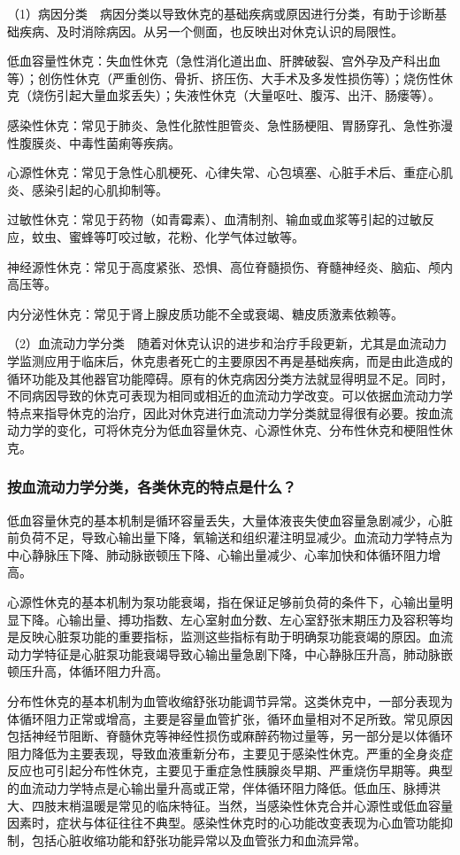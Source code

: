 （1）病因分类　病因分类以导致休克的基础疾病或原因进行分类，有助于诊断基础疾病、及时消除病因。从另一个侧面，也反映出对休克认识的局限性。

低血容量性休克：失血性休克（急性消化道出血、肝脾破裂、宫外孕及产科出血等）；创伤性休克（严重创伤、骨折、挤压伤、大手术及多发性损伤等）；烧伤性休克（烧伤引起大量血浆丢失）；失液性休克（大量呕吐、腹泻、出汗、肠瘘等）。

感染性休克：常见于肺炎、急性化脓性胆管炎、急性肠梗阻、胃肠穿孔、急性弥漫性腹膜炎、中毒性菌痢等疾病。

心源性休克：常见于急性心肌梗死、心律失常、心包填塞、心脏手术后、重症心肌炎、感染引起的心肌抑制等。

过敏性休克：常见于药物（如青霉素）、血清制剂、输血或血浆等引起的过敏反应，蚊虫、蜜蜂等叮咬过敏，花粉、化学气体过敏等。

神经源性休克：常见于高度紧张、恐惧、高位脊髓损伤、脊髓神经炎、脑疝、颅内高压等。

内分泌性休克：常见于肾上腺皮质功能不全或衰竭、糖皮质激素依赖等。

（2）血流动力学分类　随着对休克认识的进步和治疗手段更新，尤其是血流动力学监测应用于临床后，休克患者死亡的主要原因不再是基础疾病，而是由此造成的循环功能及其他器官功能障碍。原有的休克病因分类方法就显得明显不足。同时，不同病因导致的休克可表现为相同或相近的血流动力学改变。可以依据血流动力学特点来指导休克的治疗，因此对休克进行血流动力学分类就显得很有必要。按血流动力学的变化，可将休克分为低血容量休克、心源性休克、分布性休克和梗阻性休克。

\subsubsection{按血流动力学分类，各类休克的特点是什么？}

低血容量休克的基本机制是循环容量丢失，大量体液丧失使血容量急剧减少，心脏前负荷不足，导致心输出量下降，氧输送和组织灌注明显减少。血流动力学特点为中心静脉压下降、肺动脉嵌顿压下降、心输出量减少、心率加快和体循环阻力增高。

心源性休克的基本机制为泵功能衰竭，指在保证足够前负荷的条件下，心输出量明显下降。心输出量、搏功指数、左心室射血分数、左心室舒张末期压力及容积等均是反映心脏泵功能的重要指标，监测这些指标有助于明确泵功能衰竭的原因。血流动力学特征是心脏泵功能衰竭导致心输出量急剧下降，中心静脉压升高，肺动脉嵌顿压升高，体循环阻力升高。

分布性休克的基本机制为血管收缩舒张功能调节异常。这类休克中，一部分表现为体循环阻力正常或增高，主要是容量血管扩张，循环血量相对不足所致。常见原因包括神经节阻断、脊髓休克等神经性损伤或麻醉药物过量等，另一部分是以体循环阻力降低为主要表现，导致血液重新分布，主要见于感染性休克。严重的全身炎症反应也可引起分布性休克，主要见于重症急性胰腺炎早期、严重烧伤早期等。典型的血流动力学特点是心输出量升高或正常，伴体循环阻力降低。低血压、脉搏洪大、四肢末梢温暖是常见的临床特征。当然，当感染性休克合并心源性或低血容量因素时，症状与体征往往不典型。感染性休克时的心功能改变表现为心血管功能抑制，包括心脏收缩功能和舒张功能异常以及血管张力和血流异常。

